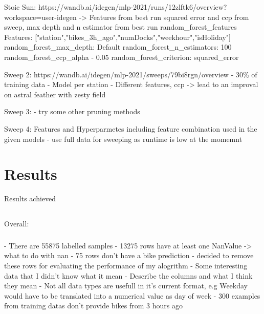 \documentclass{article}
\begin{document}
{{{{{{                        Stoic Sun: https://wandb.ai/idegen/mlp-2021/runs/12zlftk6/overview?workspace=user-idegen
                        -> Features from best run squared error and ccp from sweep, max depth and n estimator from best run
                        random\_forest\_features
                        Features: ["station","bikes\_3h\_ago","numDocks","weekhour","isHoliday"]
                        random\_forest\_max\_depth: Default
                        random\_forest\_n\_estimators: 100
                        random\_forest\_ccp\_alpha - 0.05
                        random\_forest\_criterion: squared\_error

                        Sweep 2: https://wandb.ai/idegen/mlp-2021/sweeps/79bi8rgn/overview
                        - 30\% of training data
                        - Model per station
                        - Different features, ccp
                        -> lead to an improval on astral feather with zesty field

                        Sweep 3:
                        - try some other pruning methods

                        Sweep 4: Features and Hyperparmetes including feature combination used in the given models
                        - use full data for sweeping as runtime is low at the momemnt


                        \section{Results}\label{sec:results}
                        Results achieved

                        \subsection*{}
                        Overall:

                        \subsubsection*{}
                        - There are 55875 labelled samples
                        - 13275 rows have at least one NanValue -> what to do with nan
                        - 75 rows don't have a bike prediction - decided to remove these rows for evaluating the performance of my alogrithm
                        - Some interesting data that I didn't know what it mean
                        - Describe the columns and what I think they mean
                        - Not all data types are usefull in it's current format, e.g Weekday would have to be translated into a numerical value as day of week
                        - 300 examples from training datas don't provide bikes from 3 hours ago

}}}}}}
\end{document}
